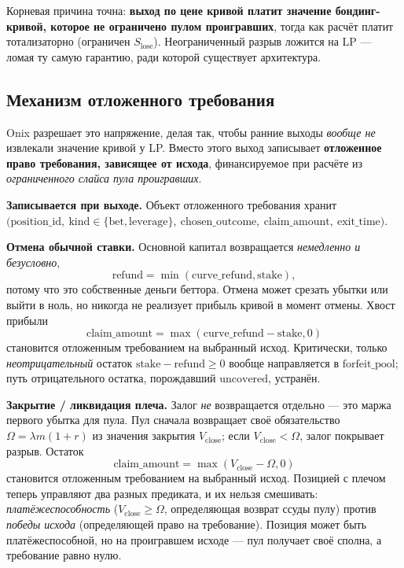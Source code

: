 \documentclass{ledger}
\theoremstyle{plain}
\theoremstyle{remark}
\begin{document}
Корневая причина точна: \textbf{выход по цене кривой платит значение бондинг-кривой,
которое не ограничено пулом проигравших}, тогда как расчёт платит тотализаторно
(ограничен $S_{\text{lose}}$). Неограниченный разрыв ложится на LP --- ломая ту самую
гарантию, ради которой существует архитектура.

\subsection{Механизм отложенного требования}\label{sec:defclaim}

Onix разрешает это напряжение, делая так, чтобы ранние выходы \emph{вообще не}
извлекали значение кривой у LP. Вместо этого выход записывает \textbf{отложенное
право требования, зависящее от исхода}, финансируемое при расчёте из
\emph{ограниченного слайса пула проигравших}.

\textbf{Записывается при выходе.} Объект отложенного требования хранит
$\big(\text{position\_id},\ \text{kind} \in \{\text{bet}, \text{leverage}\},\
\text{chosen\_outcome},\ \text{claim\_amount},\ \text{exit\_time}\big)$.

\textbf{Отмена обычной ставки.} Основной капитал возвращается \emph{немедленно и
безусловно},
\[
\text{refund} = \min(\text{curve\_refund}, \text{stake}),
\]
потому что это собственные деньги беттора. Отмена может срезать убытки или выйти в
ноль, но никогда не реализует прибыль кривой в момент отмены. Хвост прибыли
\[
\text{claim\_amount} = \max(\text{curve\_refund} - \text{stake}, 0)
\]
становится отложенным требованием на выбранный исход. Критически, только
\emph{неотрицательный} остаток $\text{stake} - \text{refund} \ge 0$ вообще
направляется в $\text{forfeit\_pool}$; путь отрицательного остатка, порождавший
$\text{uncovered}$, устранён.

\textbf{Закрытие / ликвидация плеча.} Залог \emph{не} возвращается отдельно --- это
маржа первого убытка для пула. Пул сначала возвращает своё обязательство
$\Omega = \lambda m (1 + r)$ из значения закрытия $V_{\text{close}}$; если
$V_{\text{close}} < \Omega$, залог покрывает разрыв. Остаток
\[
\text{claim\_amount} = \max(V_{\text{close}} - \Omega, 0)
\]
становится отложенным требованием на выбранный исход. Позицией с плечом теперь
управляют два разных предиката, и их нельзя смешивать: \emph{платёжеспособность}
($V_{\text{close}} \ge \Omega$, определяющая возврат ссуды пулу) против
\emph{победы исхода} (определяющей право на требование). Позиция может быть
платёжеспособной, но на проигравшем исходе --- пул получает своё сполна, а
требование равно нулю.
\end{document}
